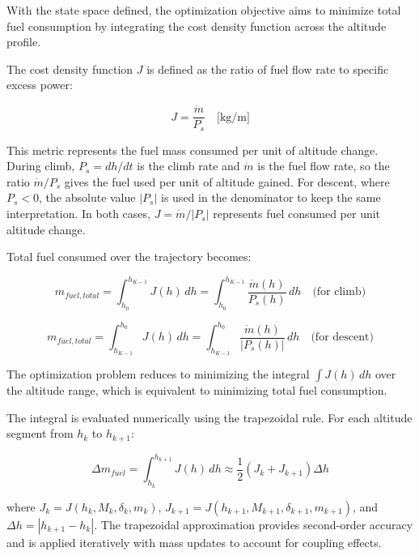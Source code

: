 With the state space defined, the optimization objective aims to minimize total fuel consumption by integrating the cost density function across the altitude profile.

The cost density function $J$ is defined as the ratio of fuel flow rate to specific excess power:

\begin{equation}
J = \frac{\dot{m}}{P_s} \quad \text{[kg/m]}
\end{equation}

This metric represents the fuel mass consumed per unit of altitude change. During climb, $P_s = dh/dt$ is the climb rate and $\dot{m}$ is the fuel flow rate, so the ratio $\dot{m}/P_s$ gives the fuel used per unit of altitude gained. For descent, where $P_s < 0$, the absolute value $|P_s|$ is used in the denominator to keep the same interpretation. In both cases, $J = \dot{m}/|P_s|$ represents fuel consumed per unit altitude change.

Total fuel consumed over the trajectory becomes:

\begin{equation}
m_{fuel,total} = \int_{h_0}^{h_{K-1}} J(h) \, dh = \int_{h_0}^{h_{K-1}} \frac{\dot{m}(h)}{P_s(h)} \, dh \quad \text{(for climb)}
\end{equation}

\begin{equation}
m_{fuel,total} = \int_{h_{K-1}}^{h_0} J(h) \, dh = \int_{h_{K-1}}^{h_0} \frac{\dot{m}(h)}{|P_s(h)|} \, dh \quad \text{(for descent)}
\end{equation}

The optimization problem reduces to minimizing the integral $\int J(h) \, dh$ over the altitude range, which is equivalent to minimizing total fuel consumption.

The integral is evaluated numerically using the trapezoidal rule. For each altitude segment from $h_k$ to $h_{k+1}$:

\begin{equation}
\Delta m_{fuel} = \int_{h_k}^{h_{k+1}} J(h) \, dh \approx \frac{1}{2}\left(J_k + J_{k+1}\right) \Delta h
\end{equation}

where $J_k = J(h_k, M_k, \delta_k, m_k)$, $J_{k+1} = J(h_{k+1}, M_{k+1}, \delta_{k+1}, m_{k+1})$, and $\Delta h = |h_{k+1} - h_k|$. The trapezoidal approximation provides second-order accuracy and is applied iteratively with mass updates to account for coupling effects.



 

